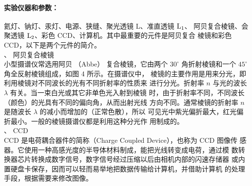 \documentclass[UTF8]{ctexart}
\begin{document}
\paragraph*{实验仪器和参数：}氦灯、钠灯、汞灯、电源、狭缝、聚光透镜 L、准直透镜 $\rm{L}_1$、
阿贝复合棱镜、会聚透镜 $\rm{L}_2$、彩色 CCD、计算机。其中最重要的元件是阿贝复合
棱镜和彩色 CCD，以下是两个元件的简介。~\\
、 阿贝复合棱镜~\\
\indent 小型摄谱仪常选用阿贝 （Abbe） 复合棱镜，它由两个 $30^{\circ}$ 角折射棱镜和一个
$45^{\circ}$ 角全反射棱镜组成，如图 4 所示。在摄谱仪中，
棱镜的主要作用是用来分光，即利用棱镜对不同波长的光有不同折射率的性质来
进行分光。折射率 $n$ 与光的波长 $\lambda$ 有关。当一束白光或其它非单色光入射到棱镜
时，由于折射率不同，不同波长（颜色）的光具有不同的偏向角，从而出射光线
方向不同。通常棱镜的折射率 $n$ 是随波长 $\lambda$ 的减小而增加的（正常色散），所以
可见光中紫光偏折最大，红光偏折最小。一般的棱镜摄谱仪都是利用这种分光作
用制成的。~\\
、 CCD ~\\
\indent CCD 是电荷耦合器件的简称（Charge Coupled Device），也称为 CCD 图像传
感器。它使用一种高感光度的半导体材料制成，能把光线转变成电荷，通过模
数转换器芯片转换成数字信号，数字信号经过压缩以后由相机内部的闪速存储器
或内置硬盘卡保存，因而可以轻而易举地把数据传输给计算机，并借助计算机
的处理手段，根据需要来修改图像。~\\
\end{document}
